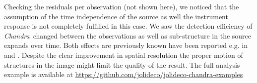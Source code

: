 \documentclass[twocolumn]{aastex631}
\newcommand{\chandra}{\textit{Chandra}~}
\newcommand{\xmm}{\textit{XMM}~}
\begin{document}
    Checking the residuals per observation (not shown here), we noticed that the assumption of the time independence of the source as well the instrument response is not completely fulfilled in this case. We saw the detection efficiency of \chandra changed between the observations as well as sub-structure in the source expands over time. Both effects are previously known have been reported e.g. in \cite{Xi2019} and \cite{}. Despite the clear improvement in spatial resolution the proper motion of structures in the image might limit the quality of the result. The full analysis example is available at \url{https://github.com/jolideco/jolideco-chandra-examples}



        
\end{document}

